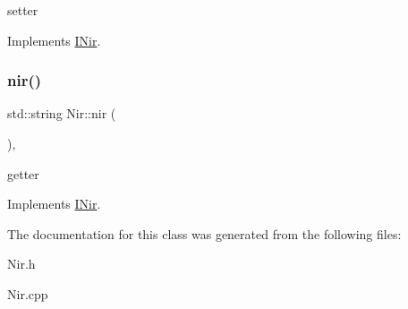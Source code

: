 setter 

Implements \mbox{\hyperlink{class_i_nir_a85dc40ecca7cfca5546664c12d224d97}{I\+Nir}}.

\mbox{\label{class_nir_a5611639ff318800e178396b0fca1a9f3}} 
\subsubsection{\texorpdfstring{nir()}{nir()}\hspace{0.1cm}{\footnotesize\ttfamily [2/2]}}
{\footnotesize\ttfamily std\+::string Nir\+::nir (\begin{DoxyParamCaption}{ }\end{DoxyParamCaption})\hspace{0.3cm}{\ttfamily [inline]}, {\ttfamily [virtual]}}

getter 

Implements \mbox{\hyperlink{class_i_nir_a15730cebcb93aaf847aa46ce976b6557}{I\+Nir}}.



The documentation for this class was generated from the following files\+:\begin{DoxyCompactItemize}
\item 
Nir.\+h\item 
Nir.\+cpp\end{DoxyCompactItemize}
